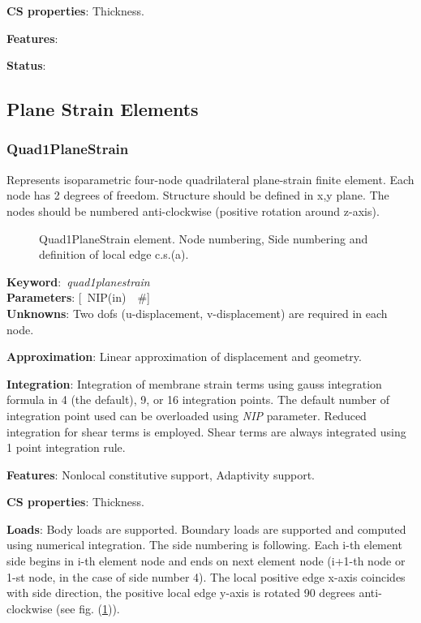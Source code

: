 \documentclass[12pt,dvips]{article}
\newcommand{\descitem}[1]{{\noindent \bf #1}:}
\newcommand{\elemkeyword}[1]{\descitem{Keyword}~{\em #1}}
\newcommand{\elemparam}[2]{{{#1\tiny (#2)}~~\#}}
\newcommand{\optelemparam}[2]{{[~\elemparam{#1}{#2}]}}
\newcommand{\param}[1]{{\it #1}}
\begin{document}
\descitem{CS properties} Thickness. 

\descitem{Features} 

\descitem{Status} 

\subsection{Plane Strain Elements}

\subsubsection{Quad1PlaneStrain}
Represents isoparametric four-node quadrilateral plane-strain
finite element. Each node has 2 degrees of freedom.
Structure should be defined in x,y plane. 
The nodes should be numbered anti-clockwise (positive rotation around
z-axis). 

\begin{figure}[tb]
\begin{center}\end{center}
\caption{Quad1PlaneStrain element. Node numbering, Side numbering and
definition of local edge c.s.(a).}
\label{Quad1PlaneStrainfig}
\end{figure}

\elemkeyword{quad1planestrain}\\
\descitem{Parameters} \optelemparam{NIP}{in}\\
\descitem{Unknowns}
Two dofs (u-displacement, v-displacement) are required in each node.

\descitem{Approximation} Linear approximation of displacement and
geometry.

\descitem{Integration}
Integration of membrane strain terms using gauss integration formula
in 4 (the default), 9, or 16 integration points. The default number of
integration point used can be overloaded using \param{NIP} parameter.
Reduced integration for shear terms is employed. Shear terms are
always integrated using 1 point integration rule.

\descitem{Features} Nonlocal constitutive support, Adaptivity support.

\descitem{CS properties} Thickness. 

\descitem{Loads} Body loads are supported. Boundary loads are
supported and computed using numerical integration. The side numbering is
following. Each i-th element side begins in i-th element node and
ends on next element node (i+1-th node or 1-st node, in the case of 
side number 4). The local positive edge x-axis coincides with side
direction, the positive local edge y-axis is rotated 90 degrees
anti-clockwise (see fig. (\ref{Quad1PlaneStrainfig})).
\end{document}
